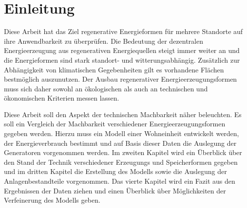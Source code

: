 \chapter{Einleitung} %
    Diese Arbeit hat das Ziel regenerative Energieformen für mehrere Standorte auf ihre Anwendbarkeit zu überprüfen.
    Die Bedeutung der dezentralen Energieerzeugung aus regenerativen Energiequellen steigt immer weiter an und die Energieformen sind stark standort- und witterungsabhängig.
    Zusätzlich zur Abhängigkeit von klimatischen Gegebenheiten gilt es vorhandene Flächen bestmöglich auszunutzen.
    Der Ausbau regenerativer Energieerzeugungsformen muss sich daher sowohl an ökologischen als auch an technischen und ökonomischen Kriterien messen lassen.

    Diese Arbeit soll den Aspekt der technischen Machbarkeit näher beleuchten.
    Es soll ein Vergleich der Machbarkeit verschiedener Energieerzeugungsformen gegeben werden.
    Hierzu muss ein Modell einer Wohneinheit entwickelt werden, der Energieverbrauch bestimmt und auf Basis dieser Daten die Auslegung der Generatoren vorgenommen werden.
    Im zweiten Kapitel wird ein Überblick über den Stand der Technik verschiedener Erzeugungs und Speicherformen gegeben und im dritten Kapitel die Erstellung des Modells sowie die Auslegung der Anlagenbestandteile vorgenommen.
    Das vierte Kapitel wird ein Fazit aus den Ergebnissen der Daten ziehen und einen Überblick über Möglichkeiten der Verfeinerung des Modells geben.
    

    
